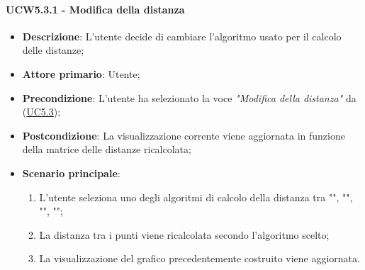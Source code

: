 \paragraph{UCW5.3.1 - Modifica della distanza}
\label{par:ucw5.3.1}
\begin{itemize}
    \item \textbf{Descrizione}: L’utente decide di cambiare l’algoritmo usato per il calcolo delle distanze;

    \item \textbf{Attore primario}: Utente;

    \item \textbf{Precondizione}:   L'utente ha selezionato la voce \emph{"Modifica della distanza"} da (\hyperref[ssub:uc5.3]{UC5.3});
    \item \textbf{Postcondizione}:  La visualizzazione corrente viene aggiornata in funzione della matrice delle distanze ricalcolata;

    \item \textbf{Scenario principale}:
          \begin{enumerate}
              \item L'utente seleziona uno degli algoritmi di calcolo della distanza tra "",
                    "", "", "";
              \item La distanza tra i punti viene ricalcolata secondo l'algoritmo scelto;
              \item La visualizzazione del grafico precedentemente costruito viene aggiornata.
          \end{enumerate}
\end{itemize}

